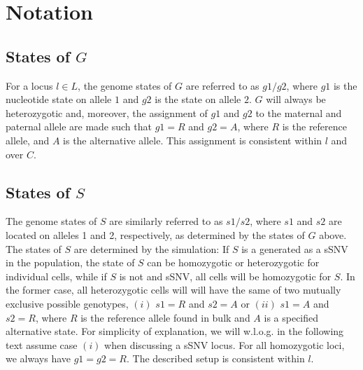 \documentclass[a4paper,11pt]{article}
\begin{document}

\section{Notation}
\label{sec:notation}



\subsection{States of $G$}
\label{sec:states-g}


For a locus $l\in L$, the genome states of $G$ are referred to as
$g1/g2$, where $g1$ is the nucleotide state on allele $1$ and $g2$ is
the state on allele $2$.  $G$ will always be heterozygotic and,
moreover, the assignment of $g1$ and $g2$ to the maternal and paternal
allele are made such that $g1=R$ and $g2=A$, where $R$ is the
reference allele, and $A$ is the alternative
allele. This assignment is consistent within
$l$ and over $C$.

\subsection{States of $S$}
\label{sec:states-s}

The genome states of $S$ are similarly referred to as $s1/s2$, where
$s1$ and $s2$ are located on alleles 1 and 2, respectively, as
determined by the states of $G$ above. The states of $S$ are
determined by the simulation: If $S$ is a generated as a sSNV in the
population, the state of $S$ can be homozygotic or heterozygotic for
individual cells, while if $S$ is not and sSNV, all cells will be
homozygotic for $S$.  In the former case, all heterozygotic cells will
will have the same of two mutually exclusive possible genotypes, $(i)$
$s1=R$ and $s2=A$ or $(ii)$ $s1=A$ and $s2=R$, where $R$ is the
reference allele found in bulk and $A$ is a specified alternative
state. For simplicity of explanation, we will w.l.o.g. in the
following text assume case $(i)$ when discussing a sSNV locus. For all
homozygotic loci, we always have $g1=g2=R$. The described setup is
consistent within $l$.
\end{document}
